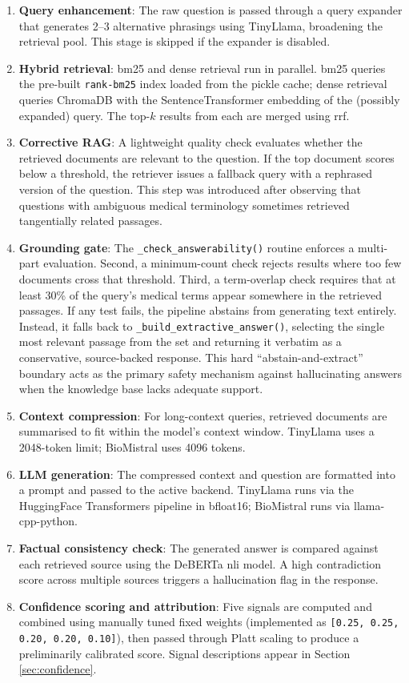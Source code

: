 \begin{enumerate}
    \item \textbf{Query enhancement}: The raw question is passed through a query expander that generates 2--3 alternative phrasings using TinyLlama, broadening the retrieval pool. This stage is skipped if the expander is disabled.
    \item \textbf{Hybrid retrieval}: \ac{bm25} and dense retrieval run in parallel. \ac{bm25} queries the pre-built \texttt{rank-bm25} index loaded from the pickle cache; dense retrieval queries ChromaDB with the SentenceTransformer embedding of the (possibly expanded) query. The top-$k$ results from each are merged using \ac{rrf}.
    \item \textbf{Corrective RAG}: A lightweight quality check evaluates whether the retrieved documents are relevant to the question. If the top document scores below a threshold, the retriever issues a fallback query with a rephrased version of the question. This step was introduced after observing that questions with ambiguous medical terminology sometimes retrieved tangentially related passages.
    \item \textbf{Grounding gate}: The \texttt{\_check\_answerability()} routine enforces a multi-part evaluation. Second, a minimum-count check rejects results where too few documents cross that threshold. Third, a term-overlap check requires that at least 30\% of the query's medical terms appear somewhere in the retrieved passages. If any test fails, the pipeline abstains from generating text entirely. Instead, it falls back to \texttt{\_build\_extractive\_answer()}, selecting the single most relevant passage from the set and returning it verbatim as a conservative, source-backed response. This hard ``abstain-and-extract'' boundary acts as the primary safety mechanism against hallucinating answers when the knowledge base lacks adequate support.
    \item \textbf{Context compression}: For long-context queries, retrieved documents are summarised to fit within the model's context window. TinyLlama uses a 2048-token limit; BioMistral uses 4096 tokens.
    \item \textbf{LLM generation}: The compressed context and question are formatted into a prompt and passed to the active backend. TinyLlama runs via the HuggingFace Transformers pipeline in bfloat16; BioMistral runs via llama-cpp-python.
    \item \textbf{Factual consistency check}: The generated answer is compared against each retrieved source using the DeBERTa \ac{nli} model. A high contradiction score across multiple sources triggers a hallucination flag in the response.
    \item \textbf{Confidence scoring and attribution}: Five signals are computed and combined using manually tuned fixed weights (implemented as \texttt{[0.25, 0.25, 0.20, 0.20, 0.10]}), then passed through Platt scaling to produce a preliminarily calibrated score. Signal descriptions appear in Section \ref{sec:confidence}.
\end{enumerate}

